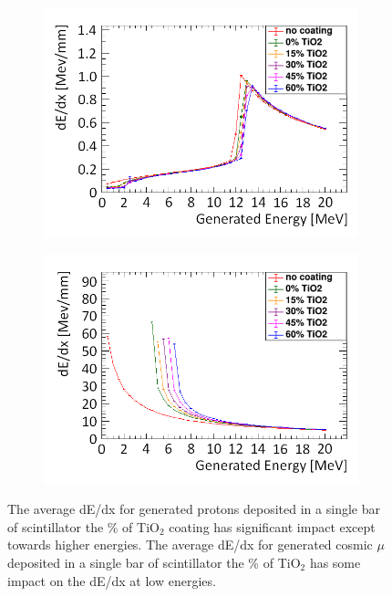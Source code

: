 \begin{figure}[!h]
\centering
\begin{subfigure}{.5\textwidth}
  \centering
  \includegraphics[width=\linewidth]{Chapter4/Figs/muon_TiO2_hybridMedText.png}
  \captionsetup{width=.9\linewidth}
  \caption{}
  \label{subFig:proton_TiO2}
\end{subfigure}%
\begin{subfigure}{.5\textwidth}
  \centering
  \includegraphics[width=\linewidth]{Chapter4/Figs/proton_TiO2_hybridMedText.png}
  \captionsetup{width=.9\linewidth}
  \caption{}
  \label{subFig:muon_TiO2}
\end{subfigure}
\caption{The average dE/dx for generated protons deposited in a single bar of scintillator the \%  of TiO$_2$ coating has significant impact except towards higher energies. The average dE/dx for generated cosmic $\mu$ deposited in a single bar of scintillator the \% of TiO$_2$ has some impact on the dE/dx at low energies.}
\label{fig:muonProton_TiO2}
\end{figure}

